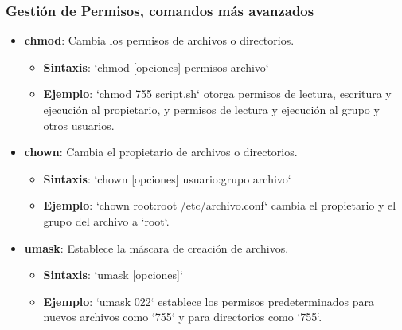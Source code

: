 \documentclass{beamer}
\begin{document}
\begin{frame}
\frametitle{Gestión de Permisos, comandos más avanzados}
\begin{itemize}
    \item \textbf{chmod}: Cambia los permisos de archivos o directorios.
    \begin{itemize}
        \item \textbf{Sintaxis}: `chmod [opciones] permisos archivo`
        \item \textbf{Ejemplo}: `chmod 755 script.sh` otorga permisos de lectura, escritura y ejecución al propietario, y permisos de lectura y ejecución al grupo y otros usuarios.
    \end{itemize}
    \item \textbf{chown}: Cambia el propietario de archivos o directorios.
    \begin{itemize}
        \item \textbf{Sintaxis}: `chown [opciones] usuario:grupo archivo`
        \item \textbf{Ejemplo}: `chown root:root /etc/archivo.conf` cambia el propietario y el grupo del archivo a `root`.
    \end{itemize}
    \item \textbf{umask}: Establece la máscara de creación de archivos.
    \begin{itemize}
        \item \textbf{Sintaxis}: `umask [opciones]`
        \item \textbf{Ejemplo}: `umask 022` establece los permisos predeterminados para nuevos archivos como `755` y para directorios como `755`.
    \end{itemize}
\end{itemize}
\end{frame}
\end{document}

